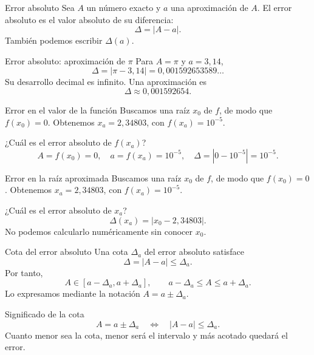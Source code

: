 \documentclass[main.tex]{subfiles}
\begin{document}
\graphicspath{{imagenes/tema6/}{../imagenes/tema6/}}



\begin{frame}{Error absoluto}
Sea $A$ un número exacto y $a$ una aproximación de $A$. El error absoluto es el valor absoluto de su diferencia:\[\boxed{\Delta=|A-a|.}\]También podemos escribir $\Delta(a)$.
\end{frame}

\begin{frame}{Error absoluto: aproximación de \texorpdfstring{$\pi$}{pi}}
Para $A=\pi$ y $a=3{,}14$,\[\Delta=|\pi-3{,}14|=0{,}001592653589\ldots\]Su desarrollo decimal es infinito. Una aproximación es\[\Delta\approx0{,}001592654.\]
\end{frame}

\begin{frame}{Error en el valor de la función}
Buscamos una raíz $x_0$ de $f$, de modo que $f(x_0)=0$. Obtenemos $x_a=2{,}34803$, con $f(x_a)=10^{-5}$.\par\medskip ¿Cuál es el error absoluto de $f(x_a)$?\[A=f(x_0)=0,\quad a=f(x_a)=10^{-5},\quad\Delta=|0-10^{-5}|=10^{-5}.\]
\end{frame}

\begin{frame}{Error en la raíz aproximada}
Buscamos una raíz $x_0$ de $f$, de modo que $f(x_0)=0$. Obtenemos $x_a=2{,}34803$, con $f(x_a)=10^{-5}$.\par\medskip ¿Cuál es el error absoluto de $x_a$?\[\Delta(x_a)=|x_0-2{,}34803|.\]No podemos calcularlo numéricamente sin conocer $x_0$.
\end{frame}

\begin{frame}{Cota del error absoluto}
Una cota $\Delta_a$ del error absoluto satisface\[\Delta=|A-a|\le\Delta_a.\]Por tanto,\[A\in[a-\Delta_a,a+\Delta_a],\qquad a-\Delta_a\le A\le a+\Delta_a.\]Lo expresamos mediante la notación $A=a\pm\Delta_a$.
\end{frame}

\begin{frame}{Significado de la cota}
\[A=a\pm\Delta_a\quad\Longleftrightarrow\quad |A-a|\le\Delta_a.\]Cuanto menor sea la cota, menor será el intervalo y más acotado quedará el error.
\end{frame}
\end{document}
